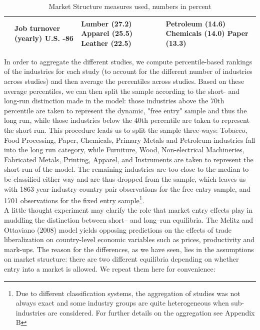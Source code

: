 \begin{center}
\begin{table}
\begin{tabular}{|p{2.8cm}|p{4cm}|p{4cm}|p{4cm}|}
\hline
\citet{Baldwin1994} & Job turnover (yearly) \newline U.S. \newline 73-86 & Lumber (27.2) \newline Apparel (25.5) \newline Leather (22.5) & Petroleum (14.6) \newline Chemicals (14.0) \newline Paper (13.3) \\
\hline   
\end{tabular}\caption{Market Structure measures used, numbers in percent}\label{tb:market_lit}
\end{table} 
\end{center}

In order to aggregate the different studies, we compute percentile-based rankings of the industries for each study (to account for the different number of industries across studies) and then average the percentiles across studies. Based on these average percentiles, we can then split the sample according to the short- and long-run distinction made in the model: those industries above the 70th percentile are taken to represent the dynamic, "free entry" sample and thus the long run, while those industries below the 40th percentile are taken to represent the short run. This procedure leads us to split the sample three-ways: Tobacco, Food Processing, Paper, Chemicals, Primary Metals and Petroleum industries fall into the long run category, while Furniture, Wood, Non-electrical Machineries, Fabricated Metals, Printing, Apparel, and Instruments are taken to represent the short run of the model. The remaining industries are too close to the median to be classified either way and are thus dropped from the sample, which leaves us with 1863 year-industry-country pair observations for the free entry sample, and 1701 observations for the fixed entry sample\footnote{Due to different classification systems, the aggregation of studies was not always exact and some industry groups are quite heterogeneous when sub-industries are considered. For further details on the aggregation see Appendix B}. \\
A little thought experiment may clarify the role that market entry effects play in muddling the distinction between short-- and long--run equilibria. The Melitz and Ottaviano (2008) model yields opposing predictions on the effects of trade liberalization on country-level economic variables such as prices, productivity and mark-ups. The reason for the differences, as we have seen, lies in the assumptions on market structure: there are two different equilibria depending on whether entry into a market is allowed. We repeat them here for convenience:
